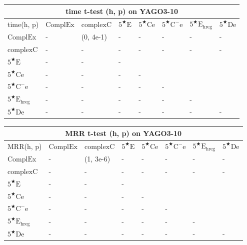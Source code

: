 \documentclass[11pt]{article}
\begin{document}
\begin{table}
\begin{tabular}{llllllll}
    \hline
    \multicolumn{8}{c}{time t-test (h, p) on YAGO3-10}\\
    \hline
    time(h, p) & $\mathrm{ComplEx}$ & $\mathrm{complexC}$ & $5^{\bigstar}\mathrm{E}$ & $5^{\bigstar}\mathrm{Ce}$ & $5^{\bigstar}\mathrm{C^{-}e}$ & $5^{\bigstar}\mathrm{E_{hreg}}$ & $5^{\bigstar}\mathrm{De}$\\
    $\mathrm{ComplEx}$ & - & (0, 4e-1) & - & - & - & - & - \\
    $\mathrm{complexC}$ & - & - & - & - & - & - & - \\
    $5^{\bigstar}\mathrm{E}$ & - & - & -\\
    $5^{\bigstar}\mathrm{Ce}$ & - & - & - & -\\
    $5^{\bigstar}\mathrm{C^{-}e}$ & - & - & - & - & -\\
    $5^{\bigstar}\mathrm{E_{hreg}}$ & - & - & - & - & - & -\\
    $5^{\bigstar}\mathrm{De}$ & - & - & - & - & - & - & -\\
    \hline
\end{tabular}
\begin{tabular}{llllllll}
    \hline
    \multicolumn{8}{c}{MRR t-test (h, p) on YAGO3-10}\\
    \hline
    MRR(h, p) & $\mathrm{ComplEx}$ & $\mathrm{complexC}$ & $5^{\bigstar}\mathrm{E}$ & $5^{\bigstar}\mathrm{Ce}$ & $5^{\bigstar}\mathrm{C^{-}e}$ & $5^{\bigstar}\mathrm{E_{hreg}}$ & $5^{\bigstar}\mathrm{De}$\\
    $\mathrm{ComplEx}$ & - & (1, 3e-6) & - & - & - & - & - \\
    $\mathrm{complexC}$ & - & - & - & - & - & - & - \\
    $5^{\bigstar}\mathrm{E}$ & - & - & -\\
    $5^{\bigstar}\mathrm{Ce}$ & - & - & - & -\\
    $5^{\bigstar}\mathrm{C^{-}e}$ & - & - & - & - & -\\
    $5^{\bigstar}\mathrm{E_{hreg}}$ & - & - & - & - & - & -\\
    $5^{\bigstar}\mathrm{De}$ & - & - & - & - & - & - & -\\
    \hline
\end{tabular}
\end{table}
\end{document}
